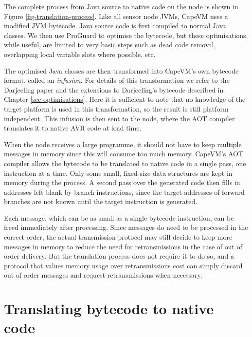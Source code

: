 The complete process from Java source to native code on the node is shown in Figure \ref{fig-translation-process}. Like all sensor node JVMs, CapeVM uses a modified JVM bytecode. Java source code is first compiled to normal Java classes. We then use ProGuard \cite{proguard} to optimise the bytecode, but these optimisations, while useful, are limited to very basic steps such as dead code removal, overlapping local variable slots where possible, etc.

The optimised Java classes are then transformed into CapeVM's own bytecode format, called an \emph{infusion}. For details of this transformation we refer to the Darjeeling paper \cite{Brouwers:2009cj} and the extensions to Darjeeling's bytecode described in Chapter \ref{sec-optimisations}. Here it is sufficient to note that no knowledge of the target platform is used in this transformation, so the result is still platform independent. This infusion is then sent to the node, where the AOT compiler translates it to native AVR code at load time.

When the node receives a large programme, it should not have to keep multiple messages in memory since this will consume too much memory. CapeVM's AOT compiler allows the bytecode to be translated to native code in a single pass, one instruction at a time. Only some small, fixed-size data structures are kept in memory during the process. A second pass over the generated code then fills in addresses left blank by branch instructions, since the target addresses of forward branches are not known until the target instruction is generated.

Each message, which can be as small as a single bytecode instruction, can be freed immediately after processing. Since messages do need to be processed in the correct order, the actual transmission protocol may still decide to keep more messages in memory to reduce the need for retransmissions in the case of out of order delivery. But the translation process does not require it to do so, and a protocol that values memory usage over retransmissions cost can simply discard out of order messages and request retransmissions when necessary.


\section{Translating bytecode to native code}
\label{sec-basic-translation}



